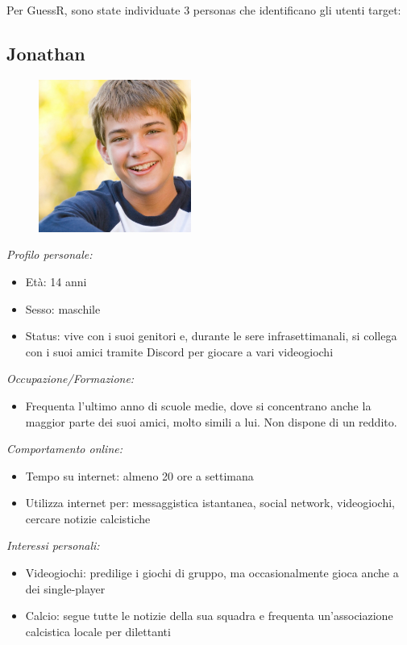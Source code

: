 \noindent Per GuessR, sono state individuate 3 personas che identificano gli utenti target:

\subsection{Jonathan}
\begin{figure}[H]
    \centering
    \includegraphics[width=50mm]{img/personas/jonathan.jpg}
    \label{fig:personas_jonathan}
\end{figure}
\textit{Profilo personale:}
\begin{itemize}
    \item Età: 14 anni
    \item Sesso: maschile
    \item Status: vive con i suoi genitori e, durante le sere infrasettimanali, si collega con i suoi amici tramite Discord per giocare a vari videogiochi
\end{itemize}
\textit{Occupazione/Formazione:}
\begin{itemize}
    \item Frequenta l'ultimo anno di scuole medie, dove si concentrano anche la maggior parte dei suoi amici, molto simili a lui. Non dispone di un reddito.
\end{itemize}
\textit{Comportamento online:}
\begin{itemize}
    \item Tempo su internet: almeno 20 ore a settimana
    \item Utilizza internet per: messaggistica istantanea, social network, videogiochi, cercare notizie calcistiche
\end{itemize}
\textit{Interessi personali:}
\begin{itemize}
    \item Videogiochi: predilige i giochi di gruppo, ma occasionalmente gioca anche a dei single-player
    \item Calcio: segue tutte le notizie della sua squadra e frequenta un'associazione calcistica locale per dilettanti
\end{itemize}
